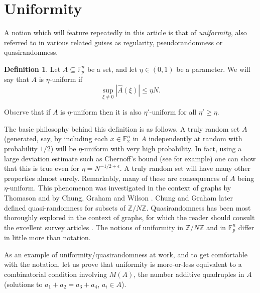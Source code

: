 \documentclass[12pt,a4paper,reqno]{amsart}
\numberwithin{equation}{section}
\theoremstyle{plain}
\theoremstyle{definition}
\newtheorem{definition}[subsection]{Definition}
\renewcommand{\leq}{\leqslant}
\renewcommand{\geq}{\geqslant}
\begin{document}
\section{Uniformity}\label{sec3}

\noindent A notion which will feature repeatedly in this article is that of \textit{uniformity}, also referred to in various related guises as regularity, pseudorandomness or quasirandomness. 

\begin{definition}
Let $A \subseteq \mathbb{F}_p^n$ be a set, and let $\eta  \in (0,1)$ be a parameter. We will say that $A$ is $\eta$-uniform if 
\[ \sup_{\xi \neq 0} |\widehat{A}(\xi)| \leq \eta N.\]
\end{definition}
\noindent Observe that if $A$ is $\eta$-uniform then it is also $\eta'$-uniform for all $\eta' \geq \eta$.\vspace{11pt}

\noindent The basic philosophy behind this definition is as follows. A truly random set $A$ (generated, say, by including each $x \in \mathbb{F}_2^n$ in $A$ independently at random with probability $1/2$) will be $\eta$-uniform with very high probability. In fact, using a large deviation estimate such as Chernoff's bound (see \cite{alon-spencer} for example) one can show that this is true even for $\eta = N^{-1/2 + \epsilon}$. A truly random set will have many other properties almost surely. Remarkably, many of these are consequences of $A$ being $\eta$-uniform. This phenomenon was investigated in the context of graphs by Thomason \cite{thomason1,thomason2} and by Chung, Graham and Wilson \cite{chung-graham-wilson}. Chung and Graham \cite{chung-graham} later defined quasi-randomness for subsets of $\mathbb{Z}/N\mathbb{Z}$. Quasirandomness has been most thoroughly explored in the context of graphs, for which the reader should consult the excellent survey articles \cite{krivelevich-sudakov,komlos-simonovits}. The notions of uniformity in $\mathbb{Z}/N\mathbb{Z}$ and in $\mathbb{F}_p^n$ differ in little more than notation.\vspace{11pt}

\noindent As an example of uniformity/quasirandomness at work, and to get comfortable with the notation, let us prove that uniformity is more-or-less equivalent to a combinatorial condition involving $M(A)$, the number additive quadruples in $A$ (solutions to $a_1 + a_2 = a_3 + a_4$, $a_i \in A$). 
\end{document}
